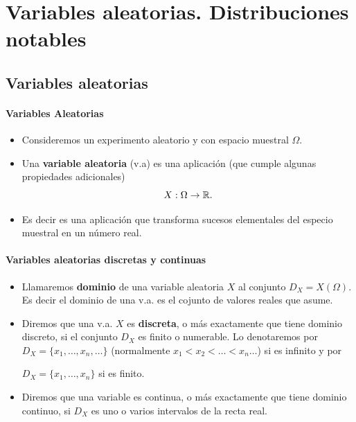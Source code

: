  

\chapter{Variables aleatorias. Distribuciones notables}



\section{Variables aleatorias}

\begin{frame}

\frametitle{Variables Aleatorias}

\begin{itemize}
\item Consideremos un experimento aleatorio y con espacio muestral $\Omega$. 
\item Una \textbf{variable aleatoria} (v.a) es una  aplicación (que cumple algunas propiedades adicionales)
$$X:\Omega\to \mathbb{R}.$$ 
\item Es decir es una aplicación que transforma sucesos elementales del especio muestral en  un número real.
\end{itemize}

\end{frame}

\begin{frame}
    \frametitle{Variables aleatorias discretas y continuas}
\begin{itemize}
\item Llamaremos \textbf{dominio} de una variable aleatoria $X$ al conjunto $D_X=X(\Omega)$. Es decir el dominio de una v.a. es el cojunto de valores reales que asume.
\item 
    Diremos que una v.a. $X$ es \textbf{discreta}, o más exactamente que tiene dominio discreto, si el conjunto $D_X$ es
    finito o numerable. Lo denotaremos por 
    $D_X=\{x_{1},\ldots,x_{n},\ldots \}$
    (normalmente $x_{1}<x_{2}<\ldots<x_{n}\ldots$) si es infinito y por 
  
    $D_X=\{x_{1},\ldots,x_{n}\}$ si es finito.
\item Diremos que una variable es continua, o más exactamente que tiene dominio continuo,  si $D_X$ es uno o varios intervalos  de la recta real. 
\end{itemize}              
\end{frame}



